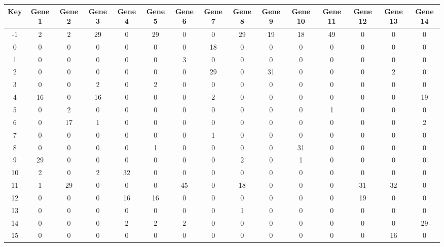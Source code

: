 \begin{tabular}{|c|c|c|c|c|c|c|c|c|c|c|c|c|c|c|}
\hline
Key & Gene 1 & Gene 2 & Gene 3 & Gene 4 & Gene 5 & Gene 6 & Gene 7 & Gene 8 & Gene 9 & Gene 10 & Gene 11 & Gene 12 & Gene 13 & Gene 14 \\
\hline
-1 & 2 & 2 & 29 & 0 & 29 & 0 & 0 & 29 & 19 & 18 & 49 & 0 & 0 & 0 \\
0 & 0 & 0 & 0 & 0 & 0 & 0 & 18 & 0 & 0 & 0 & 0 & 0 & 0 & 0 \\
1 & 0 & 0 & 0 & 0 & 0 & 3 & 0 & 0 & 0 & 0 & 0 & 0 & 0 & 0 \\
2 & 0 & 0 & 0 & 0 & 0 & 0 & 29 & 0 & 31 & 0 & 0 & 0 & 2 & 0 \\
3 & 0 & 0 & 2 & 0 & 2 & 0 & 0 & 0 & 0 & 0 & 0 & 0 & 0 & 0 \\
4 & 16 & 0 & 16 & 0 & 0 & 0 & 2 & 0 & 0 & 0 & 0 & 0 & 0 & 19 \\
5 & 0 & 2 & 0 & 0 & 0 & 0 & 0 & 0 & 0 & 0 & 1 & 0 & 0 & 0 \\
6 & 0 & 17 & 1 & 0 & 0 & 0 & 0 & 0 & 0 & 0 & 0 & 0 & 0 & 2 \\
7 & 0 & 0 & 0 & 0 & 0 & 0 & 1 & 0 & 0 & 0 & 0 & 0 & 0 & 0 \\
8 & 0 & 0 & 0 & 0 & 1 & 0 & 0 & 0 & 0 & 31 & 0 & 0 & 0 & 0 \\
9 & 29 & 0 & 0 & 0 & 0 & 0 & 0 & 2 & 0 & 1 & 0 & 0 & 0 & 0 \\
10 & 2 & 0 & 2 & 32 & 0 & 0 & 0 & 0 & 0 & 0 & 0 & 0 & 0 & 0 \\
11 & 1 & 29 & 0 & 0 & 0 & 45 & 0 & 18 & 0 & 0 & 0 & 31 & 32 & 0 \\
12 & 0 & 0 & 0 & 16 & 16 & 0 & 0 & 0 & 0 & 0 & 0 & 19 & 0 & 0 \\
13 & 0 & 0 & 0 & 0 & 0 & 0 & 0 & 1 & 0 & 0 & 0 & 0 & 0 & 0 \\
14 & 0 & 0 & 0 & 2 & 2 & 2 & 0 & 0 & 0 & 0 & 0 & 0 & 0 & 29 \\
15 & 0 & 0 & 0 & 0 & 0 & 0 & 0 & 0 & 0 & 0 & 0 & 0 & 16 & 0 \\
\hline
\end{tabular}
